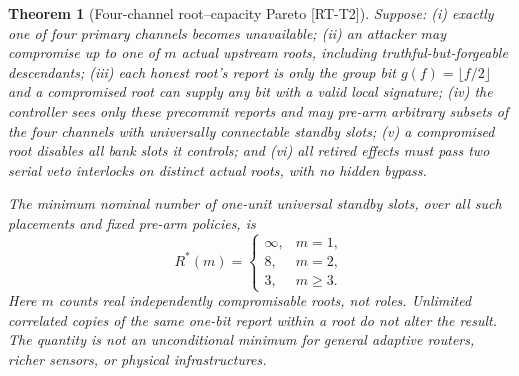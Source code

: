 \documentclass[11pt,a4paper]{article}
\newtheorem{theorem}{Theorem}
\theoremstyle{definition}\newtheorem{definition}{Definition}
\newcommand{\idtag}[1]{\textnormal{\textsf{[#1]}}}
\begin{document}
\begin{theorem}[Four-channel root--capacity Pareto \idtag{RT-T2}]
\label{thm:pareto}
Suppose: (i) exactly one of four primary channels becomes unavailable; (ii) an attacker may compromise up to one of $m$ actual upstream roots, including truthful-but-forgeable descendants; (iii) each honest root's report is only the group bit $g(f)=\lfloor f/2\rfloor$ and a compromised root can supply any bit with a valid local signature; (iv) the controller sees only these precommit reports and may pre-arm arbitrary subsets of the four channels with universally connectable standby slots; (v) a compromised root disables all bank slots it controls; and (vi) all retired effects must pass two serial veto interlocks on \emph{distinct} actual roots, with no hidden bypass.

The minimum nominal number of one-unit universal standby slots, over all such placements and fixed pre-arm policies, is
\begin{equation}\label{eq:pareto}
\boxed{R^*(m)=\begin{cases}
\infty,&m=1,\\
8,&m=2,\\
3,&m\ge3.
\end{cases}}
\end{equation}
Here $m$ counts real independently compromisable roots, not roles. Unlimited correlated copies of the same one-bit report within a root do not alter the result. The quantity is \emph{not} an unconditional minimum for general adaptive routers, richer sensors, or physical infrastructures.
\end{theorem}
\end{document}
